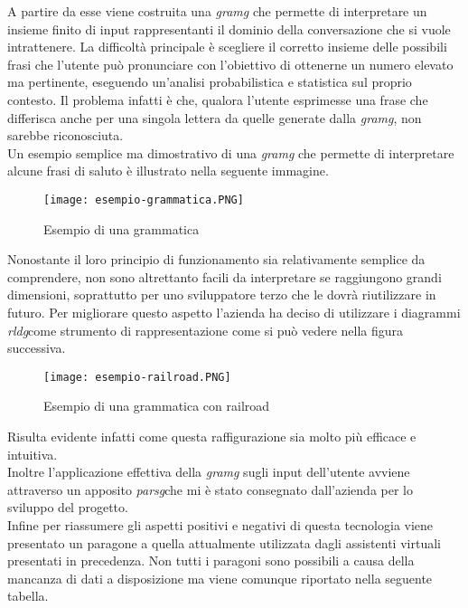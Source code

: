 A partire da esse viene costruita una \emph{\gls{gramg}} che permette di interpretare un insieme finito di input rappresentanti il dominio della conversazione che si vuole intrattenere. La difficoltà principale è scegliere il corretto insieme delle possibili frasi che l'utente può pronunciare con l'obiettivo di ottenerne un numero elevato ma pertinente, eseguendo un'analisi probabilistica e statistica sul proprio contesto. Il problema infatti è che, qualora l'utente esprimesse una frase che differisca anche per una singola lettera da quelle generate dalla \emph{\gls{gramg}}, non sarebbe riconosciuta. \\
Un esempio semplice ma dimostrativo di una \emph{\gls{gramg}} che permette di interpretare alcune frasi di saluto è illustrato nella seguente immagine.

\begin{figure}[htbp]
	\begin{center}
		\texttt{[image: esempio-grammatica.PNG]}
		\caption{Esempio di una grammatica}
	\end{center}
\end{figure}

\vspace{2cm}

Nonostante il loro principio di funzionamento sia relativamente semplice da comprendere, non sono altrettanto facili da interpretare se raggiungono grandi dimensioni, soprattutto per uno sviluppatore terzo che le dovrà riutilizzare in futuro. Per migliorare questo aspetto l'azienda ha deciso di utilizzare i diagrammi \emph{\gls{rldg}}\glsfirstoccur come strumento di rappresentazione come si può vedere nella figura successiva.

\begin{figure}[htbp]
	\begin{center}
		\texttt{[image: esempio-railroad.PNG]}
		\caption{Esempio di una grammatica con railroad}
	\end{center}
\end{figure}

Risulta evidente infatti come questa raffigurazione sia molto più efficace e intuitiva. \\
Inoltre l'applicazione effettiva della \emph{\gls{gramg}} sugli input dell'utente avviene attraverso un apposito \emph{\gls{parsg}}\glsfirstoccur che mi è stato consegnato dall'azienda per lo sviluppo del progetto. \\
Infine per riassumere gli aspetti positivi e negativi di questa tecnologia viene presentato un paragone a quella attualmente utilizzata dagli assistenti virtuali presentati in precedenza. Non tutti i paragoni sono possibili a causa della mancanza di dati a disposizione ma viene comunque riportato nella seguente tabella.

